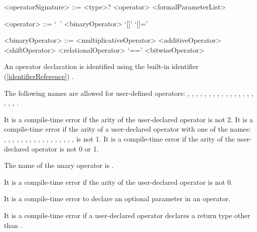 \documentclass[makeidx]{article}
\begin{document}
\begin{grammar}
<operatorSignature> ::= \gnewline{}
  <type>? \OPERATOR{} <operator> <formalParameterList>

<operator> ::= `~'
  \alt <binaryOperator>
  \alt `[]'
  \alt `[]='

<binaryOperator> ::= <multiplicativeOperator>
  \alt <additiveOperator>
  \alt <shiftOperator>
  \alt <relationalOperator>
  \alt `=='
  \alt <bitwiseOperator>
\end{grammar}

\LMHash{}%
An operator declaration is identified using the built-in identifier
(\ref{identifierReference})
\OPERATOR.

\LMHash{}%
The following names are allowed for user-defined operators:
\lit{<},
\lit{>},
\lit{<=},
\lit{>=},
\lit{==},
\lit{-},
\lit{+},
\lit{/},
\lit{\gtilde/},
\lit{*},
\lit{\%},
\lit{|},
\lit{\^},
\lit{\&},
\lit{\ltlt},
\lit{\gtgtgt},
\lit{\gtgt},
\lit{[]=},
\lit{[]},
\lit{\gtilde}.

\LMHash{}%
It is a compile-time error if the arity of the user-declared operator
\lit{[]=} is not 2.
It is a compile-time error if the arity of a user-declared operator
with one of the names:
\lit{<},
\lit{>},
\lit{<=},
\lit{>=},
\lit{==},
\lit{-},
\lit{+},
\lit{\gtilde/},
\lit{/},
\lit{*},
\lit{\%},
\lit{|},
\lit{\^},
\lit{\&},
\lit{\ltlt},
\lit{\gtgtgt},
\lit{\gtgt},
\lit{[]}
is not 1.
It is a compile-time error if the arity of the user-declared operator
\lit{-}
is not 0 or 1.


\LMHash{}%
The name of the unary operator \lit{-} is .


\LMHash{}%
It is a compile-time error if the arity of the user-declared operator
\lit{\gtilde}
is not 0.

\LMHash{}%
It is a compile-time error to declare an optional parameter in an operator.

\LMHash{}%
It is a compile-time error if a user-declared operator \lit{[]=}
declares a return type other than \VOID.

\end{document}

